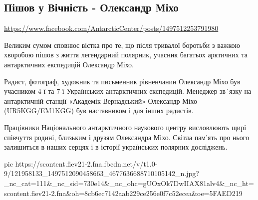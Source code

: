  


\subsection{Пішов у Вічність - Олександр Міхо}

\url{https://www.facebook.com/AntarcticCenter/posts/1497512253791980}


Великим сумом сповнює вістка про те, що після тривалої боротьби з важкою
хворобою пішов з життя легендарний полярник, учасник багатьох арктичних та
антарктичних експедицій Олександр Міхо.

Радист, фотограф, художник та письменник рівненчанин Олександр Міхо був
учасником 4-ї та 7-ї Українських антарктичних експедицій. Менеджер зв´язку на
антарктичній станції «Академік Вернадський» Олександр Міхо (UR5KGG/EM1KGG) був
наставником і для інших радистів.

Працівники Національного антарктичного наукового центру висловлюють щирі
співчуття родині, близьким і друзям Олександра Міхо. Світла пам'ять про нього
залишиться в наших серцях і в історії українських полярних досліджень.

\ifcmt
pic https://scontent.fiev21-2.fna.fbcdn.net/v/t1.0-9/121958133_1497512090458663_4677636688710105142_n.jpg?_nc_cat=111&_nc_sid=730e14&_nc_ohc=gUOxOk7DwIIAX81alv4&_nc_ht=scontent.fiev21-2.fna&oh=8cb6ec7142aab229ce256e0f7c52ecea&oe=5FAED219
\fi
